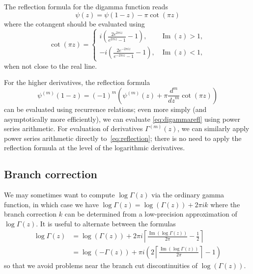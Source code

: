 \documentclass[reqno]{amsart}
\newcommand{\Imag}{\operatorname{Im}}
\theoremstyle{definition}
\begin{document}

The reflection formula for the digamma function reads
\begin{equation}
\psi\!\left(z\right) = \psi\!\left(1 - z\right) - \pi \cot\!\left(\pi z\right)
\label{eq:digammarefl}
\end{equation}
where the cotangent should be evaluated using
\begin{equation}
\cot(\pi z) =
\begin{cases}
i \left(\displaystyle \frac{2 e^{2\pi i z}}{e^{2\pi i z} - 1} - 1\right), & \operatorname{Im}(z) > 1, \\
-i \left(\displaystyle \frac{2 e^{-2\pi i z}}{e^{-2\pi i z} - 1} - 1\right), & \operatorname{Im}(z) < 1,
\end{cases}
\end{equation}
when not close to the real line.

For the higher derivatives, the reflection formula
\begin{equation}
\psi^{(m)}\!\left(1 - z\right) = {\left(-1\right)}^{m} \left(\psi^{(m)}\!\left(z\right) + \pi \frac{d^{m}}{{d z}^{m}} \cot\!\left(\pi z\right)\right)
\end{equation}
can be evaluated using recurrence relations;
even more simply (and asymptotically
more efficiently), we can evaluate \eqref{eq:digammarefl} using
power series arithmetic.
For evaluation of derivatives $\Gamma^{(m)}(z)$,
we can similarly apply power series arithmetic directly to~\eqref{eq:reflection};
there is no need to apply the reflection formula
at the level of the logarithmic derivatives.

\subsection{Branch correction}

\label{ref:branchcorrection}

We may sometimes want to compute $\log \Gamma(z)$ via the
ordinary gamma function,
in which case
we have $\log \Gamma(z) = \log(\Gamma(z)) + 2 \pi i k$
where the branch correction $k$ can be determined
from a low-precision approximation of $\log \Gamma(z)$.
It is useful to alternate between the formulas
\begin{align}
\log \Gamma(z) &= \log(\Gamma(z)) + 2 \pi i \left\lceil \frac{\Imag(\log \Gamma(z))}{2 \pi} - \frac{1}{2} \right\rceil \\
               &= \log(-\Gamma(z)) + \pi i \left(2 \left\lceil \frac{\Imag(\log \Gamma(z))}{2 \pi}\right\rceil - 1\right)
\end{align}
so that we avoid problems near the branch cut discontinuities of $\log(\Gamma(z))$.
\end{document}
